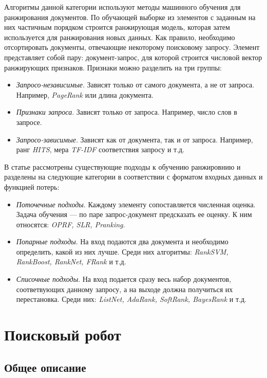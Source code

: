 Алгоритмы данной категории используют методы машинного обучения для ранжирования документов. По обучающей выборке из элементов с заданным на них частичным порядком строится ранжирующая модель, которая затем используется для ранжирования новых данных. Как правило, необходимо отсортировать документы, отвечающие некоторому поисковому запросу. Элемент представляет собой пару: документ-запрос, для которой строится числовой вектор ранжирующих признаков. Признаки можно разделить на три группы:

\begin{itemize}
\item \textit{Запросо-независимые}. Зависят только от самого документа, а не от запроса. Например, \textit{PageRank} или длина документа.
\item \textit{Признаки запроса}. Зависят только от запроса. Например, число слов в запросе.
\item \textit{Запросо-зависимые}. Зависят как от документа, так и от запроса. Например, ранг \textit{HITS}, мера \textit{TF-IDF} соответствия запросу и т.д.
\end{itemize}

В статье \cite{Liu} рассмотрены существующие подходы к обучению ранжировнию и разделены на следующие категории в соответствии с форматом входных данных и функцией потерь:

\begin{itemize}
\item \textit{Поточечные подходы}. Каждому элементу сопоставляется численная оценка. Задача обучения --- по паре запрос-документ предсказать ее оценку. К ним относятся: \textit{OPRF, SLR, Pranking}.
\item \textit{Попарные подходы}. На вход подаются два документа и необходимо определить, какой из них лучше. Среди них алгоритмы: \textit{RankSVM, RankBoost, RankNet, FRank} и т.д.
\item \textit{Списочные подходы}. На вход подается сразу весь набор документов, соответвующих данному запросу, а на выходе должна получиться их перестановка. Среди них: \textit{ListNet, AdaRank, SoftRank, BayesRank} и т.д.
\end{itemize}

\section{Поисковый робот}
\label{spider}

\subsection{Общее описание}


